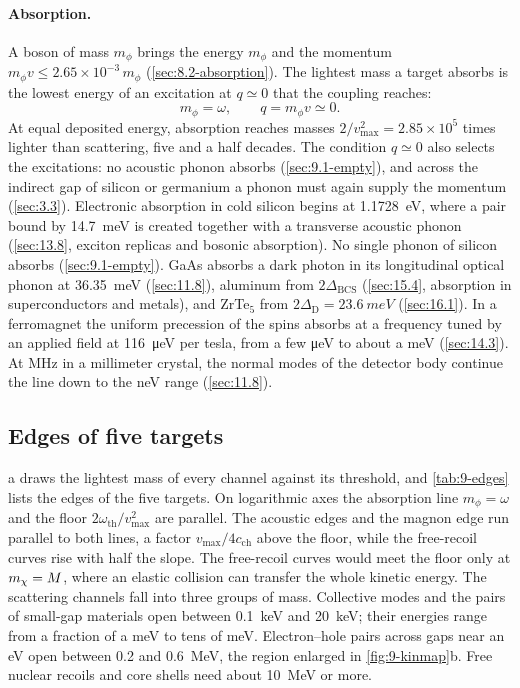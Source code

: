 \paragraph{Absorption.} A boson of mass $m_\phi$ brings the energy $m_\phi$ and the momentum $m_\phi v \le 2.65\times10^{-3}\,m_\phi$ (\cref{sec:8.2-absorption}). The lightest mass a target absorbs is the lowest energy of an excitation at $q \simeq 0$ that the coupling reaches:
\begin{equation}
  m_\phi = \omega , \qquad q = m_\phi v \simeq 0 .
  \label{eq:9.2-abs}
\end{equation}
At equal deposited energy, absorption reaches masses $2/v_{\mathrm{max}}^2 = 2.85\times10^5$ times lighter than scattering, five and a half decades. The condition $q \simeq 0$ also selects the excitations: no acoustic phonon absorbs (\cref{sec:9.1-empty}), and across the indirect gap of silicon or germanium a phonon must again supply the momentum (\cref{sec:3.3}). Electronic absorption in cold silicon begins at \SI{1.1728}{eV}, where a pair bound by \SI{14.7}{meV} is created together with a transverse acoustic phonon (\cref{sec:13.8}, exciton replicas and bosonic absorption). No single phonon of silicon absorbs (\cref{sec:9.1-empty}). GaAs absorbs a dark photon in its longitudinal optical phonon at \SI{36.35}{meV} (\cref{sec:11.8}), aluminum from $2\Delta_{\mathrm{BCS}}$ (\cref{sec:15.4}, absorption in superconductors and metals), and ZrTe$_5$ from $2\Delta_{\mathrm{D}} = \SI{23.6}{meV}$ (\cref{sec:16.1}). In a ferromagnet the uniform precession of the spins absorbs at a frequency tuned by an applied field at \SI{116}{\micro eV} per tesla, from a few \si{\micro eV} to about a meV (\cref{sec:14.3}). At MHz in a millimeter crystal, the normal modes of the detector body continue the line down to the neV range (\cref{sec:11.8}).

\subsection{Edges of five targets}\label{sec:9.2-map}

a draws the lightest mass of every channel against its threshold, and \cref{tab:9-edges} lists the edges of the five targets. On logarithmic axes the absorption line $m_\phi = \omega$ and the floor $2\omega_{\mathrm{th}}/v_{\mathrm{max}}^2$ are parallel. The acoustic edges and the magnon edge run parallel to both lines, a factor $v_{\mathrm{max}}/4c_{\mathrm{ch}}$ above the floor, while the free-recoil curves rise with half the slope. The free-recoil curves would meet the floor only at $m_{\chi} = M$, where an elastic collision can transfer the whole kinetic energy. The scattering channels fall into three groups of mass. Collective modes and the pairs of small-gap materials open between \SI{0.1}{keV} and \SI{20}{keV}; their energies range from a fraction of a meV to tens of meV. Electron--hole pairs across gaps near an eV open between 0.2 and \SI{0.6}{MeV}, the region enlarged in \cref{fig:9-kinmap}b. Free nuclear recoils and core shells need about \SI{10}{MeV} or more.

